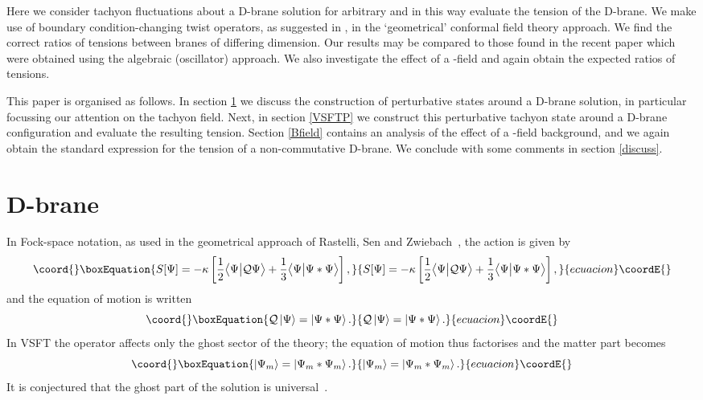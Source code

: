 \documentclass[letterpaper,12pt]{article}
\def\Pcm#1{{\mathcal{#1}}}
\begin{document}
Here we consider tachyon fluctuations about a D\coordHE{}-brane solution for arbitrary \coordHE{} 
and in this way evaluate the tension of the D-brane. We make use of boundary condition-changing
twist operators, as suggested in \cite{RSZ4}, in the `geometrical' conformal field theory 
approach. We find the correct ratios of tensions between branes of differing dimension.
Our results may be compared to those found in the recent paper \cite{Okuyama}
 which were obtained using the algebraic (oscillator) \cite{Muk,GJ1,GJ2} approach.
We also investigate the effect of a \coordHE{}-field and again obtain the expected ratios of tensions.

This paper is organised as follows. In section \ref{Dpbrane} we discuss the construction of
perturbative states around a D-brane solution, in particular focussing our attention on 
the tachyon field. Next, in section \ref{VSFTP} we construct this perturbative tachyon state 
around a D\coordHE{}-brane configuration and evaluate the resulting tension. 
 Section \ref{Bfield} contains an analysis
of the effect of a \coordHE{}-field background, and we again obtain the standard expression for the
tension of a non-commutative D-brane. We conclude with some comments in section \ref{discuss}.

\section{D\coordHE{}-brane}
\label{Dpbrane}

In Fock-space notation, as used in the geometrical approach of Rastelli, Sen and 
Zwiebach~\cite{RSZ5}, the action is given by
\begin{equation}\coord{}\boxEquation{
\label{VSFTact}
S[\Psi]=-\kappa\left[\frac12\big\langle\Psi\big|\Pcm{Q}\Psi\big\rangle+\frac13\big\langle\Psi\big|\Psi * \Psi\big\rangle \right]
,}{
S[\Psi]=-\kappa\left[\frac12\big\langle\Psi\big|\Pcm{Q}\Psi\big\rangle+\frac13\big\langle\Psi\big|\Psi * \Psi\big\rangle \right]
,}{ecuacion}\coordE{}\end{equation}
and the equation of motion is written
\begin{equation}\coord{}\boxEquation{
\label{EOM}
\Pcm{Q}\left|\Psi\right\rangle = \left|\Psi * \Psi \right\rangle
.}{
\Pcm{Q}\left|\Psi\right\rangle = \left|\Psi * \Psi \right\rangle
.}{ecuacion}\coordE{}\end{equation}
In VSFT the operator \myHighlight{$\Pcm{Q}$}\coordHE{} affects only the ghost sector 
of the theory; the equation of motion thus 
factorises and the matter part becomes
\begin{equation}\coord{}\boxEquation{
\left|\Psi_m\right\rangle = \left|\Psi_m * \Psi_m \right\rangle
.}{
\left|\Psi_m\right\rangle = \left|\Psi_m * \Psi_m \right\rangle
.}{ecuacion}\coordE{}\end{equation}
It is conjectured that the ghost part of the solution is universal~\cite{Sen}.
\end{document}
